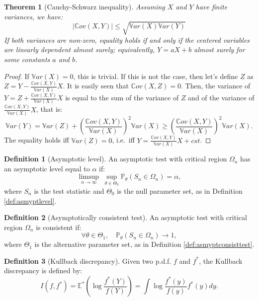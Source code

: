 \documentclass[
  11pt,
]{book}
\newtheorem{theorem}{Theorem}[chapter]
\theoremstyle{definition}
\newtheorem{definition}{Definition}[chapter]
\theoremstyle{definition}
\theoremstyle{definition}
\theoremstyle{definition}
\theoremstyle{remark}
\begin{document}
\begin{theorem}[Cauchy-Schwarz inequality]
\protect\hypertarget{thm:CauchySchwarz}{}\label{thm:CauchySchwarz}Assuming \(X\) and \(Y\) have finite variances, we have:
\[
|\mathbb{C}ov(X,Y)| \le \sqrt{\mathbb{V}ar(X)\mathbb{V}ar(Y)}
\]
If both variances are non-zero, equality holds if and only if the centered variables are linearly dependent almost surely; equivalently, \(Y=aX+b\) almost surely for some constants \(a\) and \(b\).
\end{theorem}

\begin{proof}
If \(\mathbb{V}ar(X)=0\), this is trivial. If this is not the case, then let's define \(Z\) as \(Z = Y - \frac{\mathbb{C}ov(X,Y)}{\mathbb{V}ar(X)}X\). It is easily seen that \(\mathbb{C}ov(X,Z)=0\). Then, the variance of \(Y=Z+\frac{\mathbb{C}ov(X,Y)}{\mathbb{V}ar(X)}X\) is equal to the sum of the variance of \(Z\) and of the variance of \(\frac{\mathbb{C}ov(X,Y)}{\mathbb{V}ar(X)}X\), that is:
\[
\mathbb{V}ar(Y) = \mathbb{V}ar(Z) + \left(\frac{\mathbb{C}ov(X,Y)}{\mathbb{V}ar(X)}\right)^2\mathbb{V}ar(X) \ge \left(\frac{\mathbb{C}ov(X,Y)}{\mathbb{V}ar(X)}\right)^2\mathbb{V}ar(X).
\]
The equality holds iff \(\mathbb{V}ar(Z)=0\), i.e.~iff \(Y = \frac{\mathbb{C}ov(X,Y)}{\mathbb{V}ar(X)}X+cst\).
\end{proof}

\begin{definition}[Asymptotic level]
\protect\hypertarget{def:asmyptlevelAppendix}{}\label{def:asmyptlevelAppendix}An asymptotic test with critical region \(\Omega_n\) has an asymptotic level equal to \(\alpha\) if:
\[
\limsup_{n\rightarrow\infty}\;\sup_{\theta\in\Theta_0}\mathbb{P}_\theta(S_n\in\Omega_n)=\alpha,
\]
where \(S_n\) is the test statistic and \(\Theta_0\) is the null parameter set, as in Definition \ref{def:asmyptlevel}.
\end{definition}

\begin{definition}[Asymptotically consistent test]
\protect\hypertarget{def:asmyptconsisttestAppendix}{}\label{def:asmyptconsisttestAppendix}An asymptotic test with critical region \(\Omega_n\) is consistent if:
\[
\forall \theta \in \Theta_1, \quad \mathbb{P}_\theta (S_n \in \Omega_n) \rightarrow 1,
\]
where \(\Theta_1\) is the alternative parameter set, as in Definition \ref{def:asmyptconsisttest}.
\end{definition}

\begin{definition}[Kullback discrepancy]
\protect\hypertarget{def:Kullback}{}\label{def:Kullback}Given two p.d.f. \(f\) and \(f^*\), the Kullback discrepancy is defined by:
\[
I(f,f^*) = \mathbb{E}^* \left( \log \frac{f^*(Y)}{f(Y)} \right) = \int \log \frac{f^*(y)}{f(y)} f^*(y) dy.
\]
\end{definition}
\end{document}
